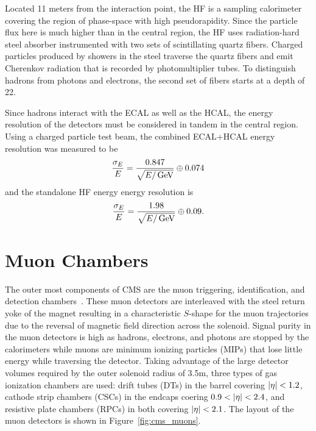 Located 11 meters from the interaction point, the HF is a sampling calorimeter covering the region of  phase-space with high pseudorapidity.
Since the particle flux here is much higher than in the central region, the HF uses radiation-hard steel absorber instrumented with two sets of scintillating quartz fibers.
Charged particles produced by showers in the steel traverse the quartz fibers and emit Cherenkov radiation that is recorded by photomultiplier tubes.
To distinguish hadrons from photons and electrons, the second set of fibers starts at a depth of 22\cm.

Since hadrons interact with the ECAL as well as the HCAL, the energy resolution of the detectors must be considered in tandem in the central region.
Using a charged particle test beam, the combined ECAL+HCAL energy resolution was measured to be
\begin{equation}
   \frac{\sigma_E}{E} = \frac{0.847}{\sqrt{E/\,\text{Ge\hspace{-.08em}V}}} \oplus 0.074
\end{equation}
and the standalone HF energy energy resolution is
\begin{equation}
   \frac{\sigma_E}{E} = \frac{1.98}{\sqrt{E/\,\text{Ge\hspace{-.08em}V}}} \oplus 0.09.
\end{equation}

\section{Muon Chambers}

The outer most components of CMS are the muon triggering, identification, and detection chambers~\cite{CMS2008}.
These muon detectors are interleaved with the steel return yoke of the magnet resulting in a characteristic $S$-shape for the muon trajectories due to the reversal of magnetic field direction across the solenoid.
Signal purity in the muon detectors is high as hadrons, electrons, and photons are stopped by the calorimeters while muons are minimum ionizing particles (MIPs) that lose little energy while traversing the detector.
Taking advantage of the large detector volumes required by the outer solenoid radius of 3.5\unit{m}, three types of gas ionization chambers are used: drift tubes (DTs) in the barrel covering $\lvert \eta \rvert < 1.2$, cathode strip chambers (CSCs) in the endcaps coering $0.9 < \lvert \eta \rvert < 2.4$, and resistive plate chambers (RPCs) in both covering $\lvert \eta \rvert < 2.1$.
The layout of the muon detectors is shown in Figure~\ref{fig:cms_muons}.

